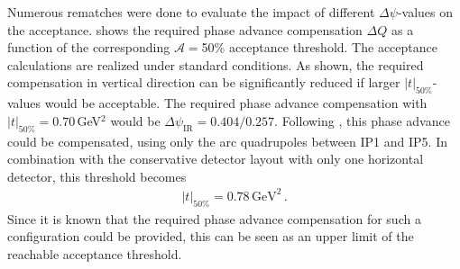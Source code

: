 Numerous rematches were done to evaluate the impact of different $\Delta \psi$-values on the acceptance.  shows the required phase advance compensation $\Delta Q$ as a function of the corresponding $\mathcal{A}=$50\% acceptance threshold. The acceptance calculations are realized under standard conditions. 
As shown, the required compensation in vertical direction can be significantly reduced if larger $|t|_{50\%}$-values would be acceptable. The required phase advance compensation with $|t|_{50\%}=0.70\,$GeV$^2$ would be $\Delta \psi_{\text{IR}} = 0.404/0.257$. Following , this phase advance could be compensated, using only the arc quadrupoles between IP1 and IP5. In combination with the conservative detector layout with only one horizontal detector, this threshold becomes
\begin{align}
|t|_{50\%}=0.78\,\text{GeV}^2\,.
\end{align}
Since it is known that the required phase advance compensation for such a configuration could be provided, this can be seen as an upper limit of the reachable acceptance threshold.